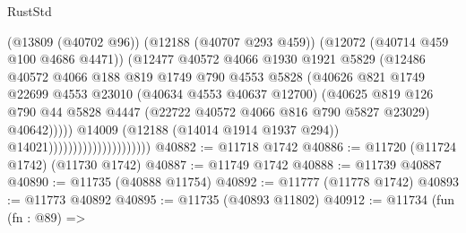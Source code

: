 \begin{lexlean}{RustStd}
\begin{coremodule}
                                                (@13809 (@40702 @96))
                                                (@12188 (@40707 @293 @459))
                                                (@12072 (@40714 @459 @100 @4686 @4471))
                                                (@12477
                                                  @40572
                                                  @4066
                                                  @1930
                                                  @1921
                                                  @5829
                                                  (@12486
                                                    @40572
                                                    @4066
                                                    @188
                                                    @819
                                                    @1749
                                                    @790
                                                    @4553
                                                    @5828
                                                    (@40626
                                                      @821
                                                      @1749
                                                      @22699
                                                      @4553
                                                      @23010
                                                      (@40634 @4553 @40637 @12700)
                                                      (@40625
                                                        @819
                                                        @126
                                                        @790
                                                        @44
                                                        @5828
                                                        @4447
                                                        (@22722 @40572 @4066 @816 @790 @5827 @23029)
                                                        @40642)))))
                                              @14009
                                              (@12188 (@14014 @1914 @1937 @294))
                                              @14021)))))))))))))))))))))
@40882 := @11718 @1742
@40886 := @11720 (@11724 @1742) (@11730 @1742)
@40887 := @11749 @1742
@40888 := @11739 @40887
@40890 := @11735 (@40888 @11754)
@40892 := @11777 (@11778 @1742)
@40893 := @11773 @40892
@40895 := @11735 (@40893 @11802)
@40912 := @11734
    (fun (fn : @89) =>

\end{coremodule}
\end{lexlean}
